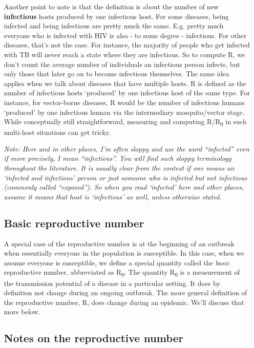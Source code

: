 \documentclass[]{article}
\theoremstyle{definition}
\theoremstyle{definition}
\theoremstyle{definition}
\theoremstyle{remark}
\begin{document}
Another point to note is that the definition is about the number of new
\textbf{infectious} hosts produced by one infectious host. For some
diseases, being infected and being infectious are pretty much the same.
E.g. pretty much everyone who is infected with HIV is also - to some
degree - infectious. For other diseases, that's not the case. For
instance, the majority of people who get infected with TB will never
reach a state where they are infectious. So to compute R, we don't count
the average number of individuals an infectious person infects, but only
those that later go on to become infectious themselves. The same idea
applies when we talk about diseases that have multiple hosts. R is
defined as the number of infectious hosts `produced' by one infectious
host of the same type. For instance, for vector-borne diseases, R would
be the number of infectious humans `produced' by one infectious human
via the intermediary mosquito/vector stage. While conceptually still
straightforward, measuring and computing R/R\textsubscript{0} in such
multi-host situations can get tricky.

\emph{Note: Here and in other places, I'm often sloppy and use the word
``infected'' even if more precisely, I mean ``infectious''. You will
find such sloppy terminology throughout the literature. It is usually
clear from the context if one means an `infected and infectious' person
or just someone who is infected but not infectious (commonly called
``exposed''). So when you read `infected' here and other places, assume
it means that host is `infectious' as well, unless otherwise stated.}

\subsection{Basic reproductive number}\label{basic-reproductive-number}

A special case of the reproductive number is at the beginning of an
outbreak when essentially everyone in the population is susceptible. In
this case, when we assume everyone is susceptible, we define a special
quantity called the \emph{basic} reproductive number, abbreviated as
R\textsubscript{0}. The quantity R\textsubscript{0} is a measurement of
the transmission potential of a disease in a particular setting. It does
by definition not change during an ongoing outbreak. The more general
definition of the reproductive number, R, does change during an
epidemic. We'll discuss that more below.

\subsection{Notes on the reproductive
number}\label{notes-on-the-reproductive-number}
\end{document}
